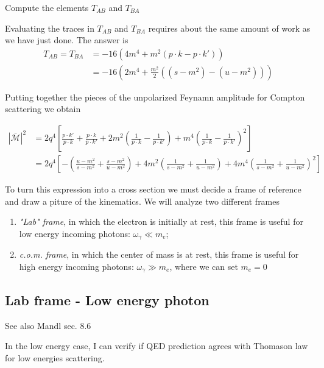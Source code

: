 \documentclass[TheoreticalPhy_ModB.tex]{subfiles}
\begin{document}
\begin{example}
Compute the elements $T_{AB}$ and $T_{BA}$
\end{example}

Evaluating the traces in $T_{AB}$ and $T_{BA}$ requires about the same amount of work as we have just done. The answer is 
\begin{align*}
T_{AB}=T_{BA}&=-16\left(4m^4+m^2(p\cdot k-p\cdot k')\right)\\
&=-16\left(2m^4+\frac{m^2}2((s-m^2)-(u-m^2))\right)
\end{align*}

Putting together the pieces of the unpolarized Feynamn amplitude for Compton scattering we obtain

\begin{align*}
|\bar{\mathcal M}|^2&=2q^4\left[\frac{p\cdot k'}{p\cdot k}+\frac{p\cdot k}{p\cdot k'}+2m^2\left(\frac1{p\cdot k}-\frac1{p\cdot k'}\right)+m^4\left(\frac1{p\cdot k}-\frac1{p\cdot k'}\right)^2\right]\\
&=2q^4\left[-\left(\frac{u-m^2}{s-m^2}+\frac{s-m^2}{u-m^2}\right)+4m^2\left(\frac1{s-m^2}+\frac1{u-m^2}\right)+4m^4\left(\frac1{s-m^2}+\frac1{u-m^2}\right)^2\right]
\end{align*}

To turn this expression into a cross section we must decide a frame of reference and draw a piture of the kinematics. We will analyze two different frames
\begin{enumerate}
\item \emph{"Lab" frame}, in which the electron is initially at rest, this frame is useful for low energy incoming photons: $\omega_\gamma\ll m_e$;
\item \emph{c.o.m. frame}, in which the center of mass is at rest, this frame is useful for high energy incoming photons: $\omega_\gamma\gg m_e$, where we can set $m_e=0$
\end{enumerate}

\subsection{Lab frame - Low energy photon}
\textsf{See also Mandl sec. 8.6}

In the low energy case, I can verify if QED prediction agrees with Thomason law for low energies scattering.

\begin{figure}[H]
\centering

\end{figure}
\end{document}
